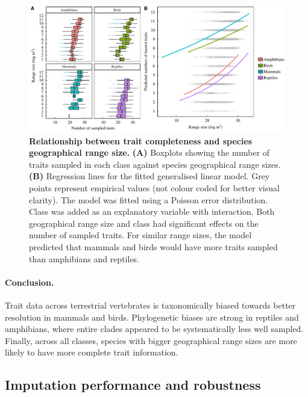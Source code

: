 \begin{figure}[h!]
\centering
\includegraphics[scale=0.7]{figures/chapter2/NA_spatial_patterns/Poisson_model_predictions}
\caption[Relationship between trait completeness and species geographical range size]{\textbf{Relationship between trait completeness and species geographical range size.} \textbf{(A)} Boxplots showing the number of traits sampled in each class against species geographical range sizes. \textbf{(B)} Regression lines for the fitted generalised linear model. Grey points represent empirical values (not colour coded for better visual clarity). The model was fitted using a Poisson error distribution. Class was added as an explanatory variable with interaction. Both geographical range size and class had significant effects on the number of sampled traits. For similar range sizes, the model predicted that mammals and birds would have more traits sampled than amphibians and reptiles.}
\label{poisson}
\end{figure}

\paragraph{Conclusion.} Trait data across terrestrial vertebrates is taxonomically biased towards better resolution in mammals and birds. Phylogenetic biases are strong in reptiles and amphibians, where entire clades appeared to be systematically less well sampled. Finally, across all classes, species with bigger geographical range sizes are more likely to have more complete trait information. 

\subsection{Imputation performance and robustness}

